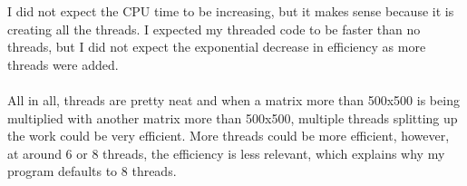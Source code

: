 \documentclass[11pt]{article}
\begin{document}
I did not expect the CPU time to be increasing, but it makes sense because it is creating all the threads. I expected my threaded code to be faster than no threads, but I did not expect the exponential decrease in efficiency as more threads were added. \\
\\
All in all, threads are pretty neat and when a matrix more than 500x500 is being multiplied with another matrix more than 500x500, multiple threads splitting up the work could be very efficient. More threads could be more efficient, however, at around 6 or 8 threads, the efficiency is less relevant, which explains why my program defaults to 8 threads. 
\end{document}
